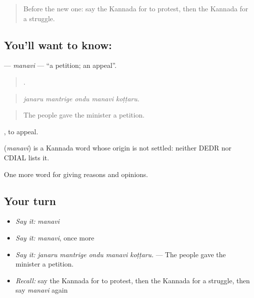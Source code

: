 \label{lesson:KA-C398-manavi}



\begin{quote}
Before the new one: say the Kannada for to protest, then the Kannada for a struggle.
\end{quote}

\subsection*{You'll want to know: }
\textbf{} — \emph{manavi} — \textquotedblleft{}a petition; an appeal\textquotedblright{}.

\begin{quote}
    .
\end{quote}

\begin{quote}
\emph{janaru mantrige ondu manavi koṭṭaru.}
\end{quote}

\begin{quote}
The people gave the minister a petition.
\end{quote}

 , to appeal.

\begin{cousinweb}
\textbf{} (\emph{manavi}) is a Kannada word whose origin is not settled: neither DEDR nor CDIAL lists it.
\end{cousinweb}

\begin{grammarlens}[title={What you've built}]
One more word for giving reasons and opinions.
\end{grammarlens}

\subsection*{Your turn}
\begin{itemize}
\raggedright
  \item \emph{Say it:} \emph{manavi}
  \item \emph{Say it:} \emph{manavi}, once more
  \item \emph{Say it:} \emph{janaru mantrige ondu manavi koṭṭaru.} — The people gave the minister a petition.
  \item \emph{Recall:} say the Kannada for to protest, then the Kannada for a struggle, then say \emph{manavi} again
\end{itemize}

